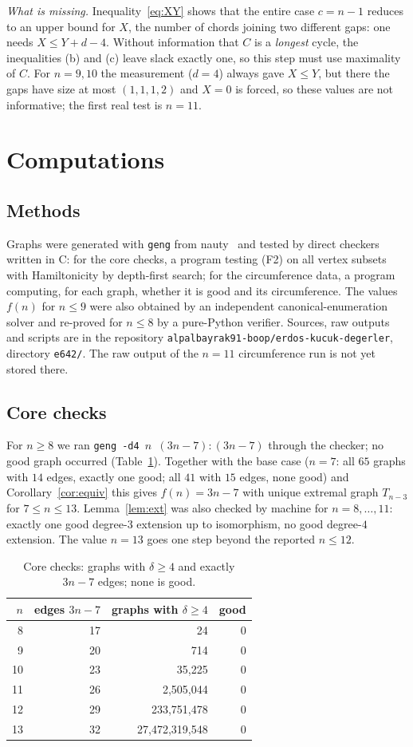 \documentclass[11pt]{amsart}
\theoremstyle{remark}
\newcommand{\Tm}[1]{T_{#1}}
\begin{document}
\emph{What is missing.} Inequality~\eqref{eq:XY} shows that the entire case $c=n-1$ reduces to an upper bound for $X$, the number of chords joining two different gaps: one needs $X\le Y+d-4$. Without information that $C$ is a \emph{longest} cycle, the inequalities (b) and (c) leave slack exactly one, so this step must use maximality of $C$. For $n=9,10$ the measurement ($d=4$) always gave $X\le Y$, but there the gaps have size at most $(1,1,1,2)$ and $X=0$ is forced, so these values are not informative; the first real test is $n=11$.

\section{Computations}

\subsection*{Methods}
Graphs were generated with \texttt{geng} from nauty~\cite{MP14} and tested by direct checkers written in C: for the core checks, a program testing (F2) on all vertex subsets with Hamiltonicity by depth-first search; for the circumference data, a program computing, for each graph, whether it is good and its circumference. The values $f(n)$ for $n\le 9$ were also obtained by an independent canonical-enumeration solver and re-proved for $n\le8$ by a pure-Python verifier. Sources, raw outputs and scripts are in the repository \texttt{alpalbayrak91-boop/erdos-kucuk-degerler}, directory \texttt{e642/}. The raw output of the $n=11$ circumference run is not yet stored there.

\subsection*{Core checks}
For $n\ge 8$ we ran \texttt{geng -d4 $n$ $(3n-7){:}(3n-7)$} through the checker; no good graph occurred (Table~\ref{tab:core}). Together with the base case ($n=7$: all $65$ graphs with $14$ edges, exactly one good; all $41$ with $15$ edges, none good) and Corollary~\ref{cor:equiv} this gives $f(n)=3n-7$ with unique extremal graph $\Tm{n-3}$ for $7\le n\le13$. Lemma~\ref{lem:ext} was also checked by machine for $n=8,\dots,11$: exactly one good degree-$3$ extension up to isomorphism, no good degree-$4$ extension. The value $n=13$ goes one step beyond the reported $n\le12$.

\begin{table}[h]
\caption{Core checks: graphs with $\delta\ge4$ and exactly $3n-7$ edges; none is good.}\label{tab:core}
\begin{tabular}{rrrr}
\toprule
$n$ & edges $3n-7$ & graphs with $\delta\ge4$ & good\\
\midrule
8 & 17 & 24 & 0\\
9 & 20 & 714 & 0\\
10 & 23 & 35,225 & 0\\
11 & 26 & 2,505,044 & 0\\
12 & 29 & 233,751,478 & 0\\
13 & 32 & 27,472,319,548 & 0\\
\bottomrule
\end{tabular}
\end{table}
\end{document}
